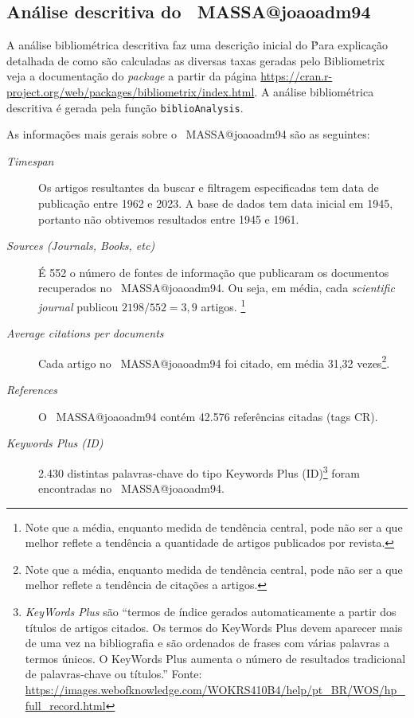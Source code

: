 \subsection{Análise descritiva do \dataset\ MASSA@joaoadm94}

A análise bibliométrica descritiva faz uma descrição inicial do \dataset\. Para explicação detalhada de como são calculadas as diversas taxas geradas pelo Bibliometrix veja a documentação do \textit{package} a partir da página \url{https://cran.r-project.org/web/packages/bibliometrix/index.html}. A análise bibliométrica descritiva é gerada pela função \texttt{biblioAnalysis}.

As informações mais gerais sobre o \dataset\   MASSA@joaoadm94 são as seguintes:
\begin{description}
    \item [\textit{Timespan}] Os artigos resultantes da buscar e filtragem especificadas tem data de publicação entre 1962 e 2023. A base de dados tem data inicial em 1945, portanto não obtivemos resultados entre 1945 e 1961.
    \item [\textit{Sources (Journals, Books, etc)}] É 552 o número de fontes de informação que publicaram os documentos recuperados no \dataset\ MASSA@joaoadm94. Ou seja, em média, cada \textit{scientific journal} publicou $2198/552=3,9$ artigos. \footnote{Note que a média, enquanto medida de tendência central, pode não ser a que melhor reflete a tendência a quantidade de artigos publicados por revista.}
    \item [\textit{Average citations per documents}] Cada artigo no \dataset\   MASSA@joaoadm94 foi citado, em média 31,32 vezes\footnote{Note que a média, enquanto medida de tendência central, pode não ser a que melhor reflete a tendência de  citações a artigos.}.
    \item [\textit{References}] O \dataset\   MASSA@joaoadm94 contém 42.576 referências citadas (tags CR).
    \item [\textit{Keywords Plus (ID)}] 2.430 distintas palavras-chave do tipo Keywords Plus (ID)\footnote{\textit{KeyWords Plus} são ``termos de índice gerados automaticamente a partir dos títulos de artigos citados. Os termos do KeyWords Plus devem aparecer mais de uma vez na bibliografia e são ordenados de frases com várias palavras a termos únicos. O KeyWords Plus aumenta o número de resultados tradicional de palavras-chave ou títulos.'' Fonte: \url{https://images.webofknowledge.com/WOKRS410B4/help/pt_BR/WOS/hp_full_record.html}} foram encontradas no \dataset\   MASSA@joaoadm94. 

\end{description}
